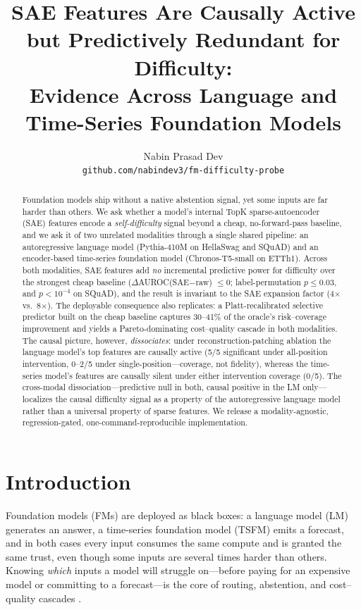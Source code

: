 \documentclass[11pt]{article}
\title{\bfseries SAE Features Are Causally Active but Predictively Redundant
for Difficulty:\\ Evidence Across Language and Time-Series Foundation Models}
\author{%
  Nabin Prasad Dev \\
  \texttt{github.com/nabindev3/fm-difficulty-probe}
}
\date{}
\newcommand{\dauroc}{$\Delta$AUROC}
\newcommand{\sae}{SAE}
\begin{document}
\maketitle

\begin{abstract}
Foundation models ship without a native abstention signal, yet some inputs are
far harder than others. We ask whether a model's internal TopK sparse-autoencoder
(\sae) features encode a \emph{self-difficulty} signal beyond a cheap, no-forward-pass
baseline, and we ask it of two unrelated modalities through a single shared
pipeline: an autoregressive language model (Pythia-410M on HellaSwag and SQuAD)
and an encoder-based time-series foundation model (Chronos-T5-small on ETTh1).
Across both modalities, \sae{} features add \emph{no} incremental predictive power
for difficulty over the strongest cheap baseline (\dauroc{}(\sae{}$-$raw)
$\le 0$; label-permutation $p \le 0.03$, and $p<10^{-4}$ on SQuAD), and the
result is invariant to the \sae{} expansion factor (4$\times$ vs.\ 8$\times$).
The deployable consequence also replicates: a Platt-recalibrated selective
predictor built on the cheap baseline captures \mbox{30--41\%} of the oracle's
risk--coverage improvement and yields a Pareto-dominating cost--quality cascade
in both modalities. The causal picture, however, \emph{dissociates}: under
reconstruction-patching ablation the language model's top features are causally
active (5/5 significant under all-position intervention, 0--2/5 under
single-position---coverage, not fidelity), whereas the time-series model's
features are causally silent under either intervention coverage (0/5). The
cross-modal dissociation---predictive null in both, causal positive in the LM
only---localizes the causal difficulty signal as a property of the autoregressive
language model rather than a universal property of sparse features. We release a
modality-agnostic, regression-gated, one-command-reproducible implementation.
\end{abstract}

\section{Introduction}
\label{sec:intro}

Foundation models (FMs) are deployed as black boxes: a language model (LM)
generates an answer, a time-series foundation model (TSFM) emits a forecast, and
in both cases every input consumes the same compute and is granted the same
trust, even though some inputs are several times harder than others. Knowing
\emph{which} inputs a model will struggle on---before paying for an expensive
model or committing to a forecast---is the core of routing, abstention, and
cost--quality cascades \citep{chen2023frugalgpt,ong2024routellm}.
\end{document}
